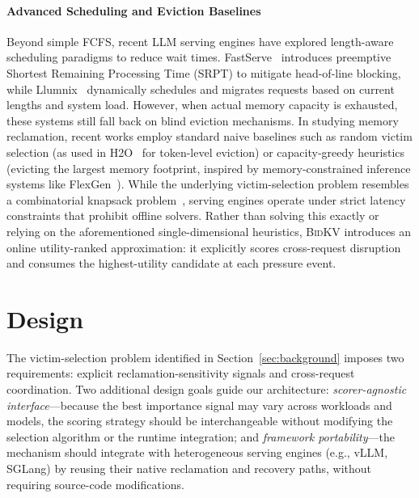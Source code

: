\documentclass[conference]{IEEEtran}
\newcommand{\bidkv}{\textsc{BidKV}\xspace}
\newcommand{\eg}{e.g., }
\begin{document}
\paragraph{Advanced Scheduling and Eviction Baselines}
Beyond simple FCFS, recent LLM serving engines have explored length-aware
scheduling paradigms to reduce wait times.
FastServe~\cite{wu2023fastserve} introduces preemptive Shortest Remaining
Processing Time (SRPT) to mitigate head-of-line blocking, while
Llumnix~\cite{sun2024llumnix} dynamically schedules and migrates requests
based on current lengths and system load.
However, when actual memory capacity is exhausted, these systems still fall
back on blind eviction mechanisms.
In studying memory reclamation, recent works employ standard naive baselines
such as random victim selection (as used in H2O~\cite{Zhang2023h2o} for
token-level eviction) or capacity-greedy heuristics (evicting the largest
memory footprint, inspired by memory-constrained inference systems like
FlexGen~\cite{Sheng2023flexgen}).
While the underlying victim-selection problem resembles a combinatorial
knapsack problem~\cite{Kellerer2004, Martello1993}, serving engines operate
under strict latency constraints that prohibit offline solvers.
Rather than solving this exactly or relying on the aforementioned
single-dimensional heuristics, \bidkv introduces an online utility-ranked
approximation: it explicitly scores cross-request disruption and consumes the
highest-utility candidate at each pressure event.


\section{Design}\label{sec:design}

The victim-selection problem identified in Section~\ref{sec:background}
imposes two requirements: explicit reclamation-sensitivity signals and
cross-request coordination.  Two additional design goals guide our architecture:
\emph{scorer-agnostic interface}---because the best importance signal may vary
across workloads and models, the scoring strategy should be interchangeable
without modifying the selection algorithm or the runtime integration; and
\emph{framework portability}---the mechanism should integrate with heterogeneous
serving engines (\eg vLLM, SGLang) by reusing their native reclamation and
recovery paths, without requiring source-code modifications.
\end{document}

